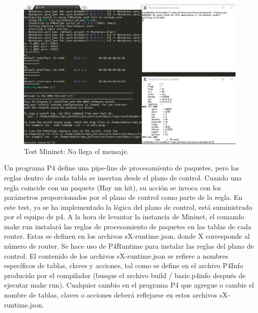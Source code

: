 \begin{figure}[!htb]
  \centering
    \includegraphics[width=\linewidth]{./img/test/1.JPG}
    \caption{Test Mininet: No llega el mensaje.}
  \label{fig:yo}
\end{figure}


Un programa P4 define una pipe-line de procesamiento de paquetes, pero las reglas dentro de cada tabla se insertan desde el plano de control. Cuando una regla coincide con un paquete (Hay un hit), su acción se invoca con los parámetros proporcionados por el plano de control como parte de la regla.\newline
\newline
En este test, ya se ha implementado la lógica del plano de control, está suministrado por el equipo de p4. A la hora de levantar la instancia de Mininet, el comando make run instalará las reglas de procesamiento de paquetes en las tablas de cada router. Estas se definen en los archivos sX-runtime.json, donde X corresponde al número de router.\newline
\newline
Se hace uso de P4Runtime para instalar las reglas del plano de control. El contenido de los archivos sX-runtime.json se refiere a nombres específicos de tablas, claves y acciones, tal como se define en el archivo P4Info producido por el compilador (busque el archivo build / basic.p4info después de ejecutar make run). Cualquier cambio en el programa P4 que agregue o cambie el nombre de tablas, claves o acciones deberá reflejarse en estos archivos sX-runtime.json.

